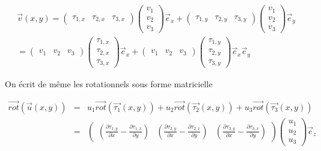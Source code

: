 \documentclass[a4paper,12pt]{article}
\begin{document}
\begin{equation*}
\begin{split}
  \vec{v}(x,y) =
  \begin{pmatrix}
    \tau_{1,x} & \tau_{2,x} & \tau_{3,x}
  \end{pmatrix}
  \begin{pmatrix}
    v_{1} \\ v_{2} \\ v_{3}
  \end{pmatrix}
  \vec{e}_{x}
  +
  \begin{pmatrix}
    \tau_{1,y} & \tau_{2,y} & \tau_{3,y}
  \end{pmatrix}
  \begin{pmatrix}
    v_{1} \\ v_{2} \\ v_{3}
  \end{pmatrix}
  \vec{e}_{y}
  \\
  =
  \begin{pmatrix}
    v_{1} & v_{2} & v_{3}
  \end{pmatrix}
    \begin{pmatrix}
    \tau_{1,x} \\ \tau_{2,x} \\ \tau_{3,x}
  \end{pmatrix}
  \vec{e}_{x}
  +
  \begin{pmatrix}
    v_{1} & v_{2} & v_{3}
  \end{pmatrix}
    \begin{pmatrix}
    \tau_{1,y} \\ \tau_{2,y} \\ \tau_{3,y}
  \end{pmatrix}
  \vec{e}_{x}
  \vec{e}_{y}
\end{split} 
\end{equation*}

On écrit de même les rotationnels sous forme matricielle 

\begin{eqnarray*}
\vec{rot}(\vec{u}(x,y)) &=& 
u_{1} \vec{rot}(\vec{\tau_{1}}(x,y)) + u_{2} \vec{rot}(\vec{\tau_{2}}(x,y)) + u_{3} \vec{rot}(\vec{\tau_{3}}(x,y)) \\
&=& 
\begin{pmatrix}
(\frac{\partial \tau_{1,y}}{\partial x} - \frac{\partial \tau_{1,x}}{\partial y})
&
(\frac{\partial \tau_{2,y}}{\partial x} - \frac{\partial \tau_{2,x}}{\partial y})
&
(\frac{\partial \tau_{3,y}}{\partial x} - \frac{\partial \tau_{3,x}}{\partial y})
\end{pmatrix}
\begin{pmatrix}
  u_{1} \\ u_{2} \\ u_{3}
\end{pmatrix}
\vec{e}_{z}
\end{eqnarray*}
\end{document}
